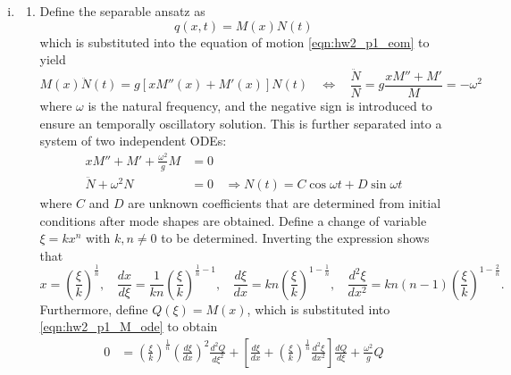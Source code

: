 \begin{enumerate}[(i)]
{The constants $\rho g$ is typically positive and can be cancelled. 
}
\item { %
\begin{enumerate}[(1)]
\item { %
    Define the separable ansatz as 
    \begin{equation}
        q(x, t) = M(x) N(t)
    \end{equation}
    which is substituted into the equation of motion \cref{eqn:hw2_p1_eom} to yield
    \begin{equation}
        M(x) \ddot{N}(t) = g \left[ x M''(x) + M'(x) \right] N(t) ~~~~ \Leftrightarrow ~~~~ \frac{\ddot{N}}{N} = g \frac{x M'' + M'}{M} = -\omega^2
    \end{equation}
    where $\omega$ is the natural frequency, and the negative sign is introduced to ensure an temporally oscillatory solution. 
    This is further separated into a system of two independent ODEs:
    \begin{subequations}
    \begin{align}
        x M'' + M' + \frac{\omega^2}{g} M &= 0 \label{eqn:hw2_p1_M_ode} \\
        \ddot{N} + \omega^2 N &= 0 ~~~~ \Rightarrow N(t) = C\cos\omega t + D \sin\omega t \label{eqn:hw2_p1_N_ode}
    \end{align}
    \end{subequations}
    where $C$ and $D$ are unknown coefficients that are determined from initial conditions after mode shapes are obtained. 
    Define a change of variable $\xi = kx^n$ with $k, n \neq 0$ to be determined. 
    Inverting the expression shows that 
    \begin{equation}
        x = {\left(\frac{\xi}{k}\right)}^{\frac{1}{n}}, ~~~~ \frac{dx}{d\xi} = \frac{1}{kn} {\left(\frac{\xi}{k}\right)}^{\frac{1}{n} - 1}, ~~~~ \frac{d\xi}{dx} = kn {\left(\frac{\xi}{k}\right)}^{1 - \frac{1}{n}}, ~~~~ \frac{d^2\xi}{dx^2} = kn(n-1) {\left(\frac{\xi}{k}\right)}^{1 - \frac{2}{n}}.
    \end{equation}
    Furthermore, define $Q(\xi) = M(x)$, which is substituted into \cref{eqn:hw2_p1_M_ode} to obtain
    \begin{equation}
    \begin{aligned}
        0 &= {\left(\frac{\xi}{k}\right)}^{\frac{1}{n}} {\left(\frac{d\xi}{dx}\right)}^2 \frac{d^2 Q}{d\xi^2} + \left[\frac{d\xi}{dx} + {\left(\frac{\xi}{k}\right)}^{\frac{1}{n}} \frac{d^2\xi}{dx^2}\right]\frac{dQ}{d\xi} + \frac{\omega^2}{g}Q \\

\end{aligned}
\end{equation}}
\end{enumerate}}
\end{enumerate}
